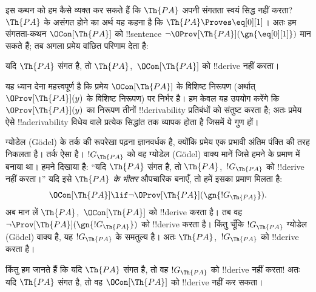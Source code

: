 \documentclass[../../../include/open-logic-section]{subfiles}
\begin{document}


इस कथन को हम कैसे व्यक्त कर सकते हैं कि $\Th{PA}$ अपनी संगतता स्वयं सिद्ध
नहीं करता? $\Th{PA}$ के असंगत होने का अर्थ यह कहना है कि
$\Th{PA} \Proves \eq[0][1]$। अतः हम संगतता-कथन $\OCon[\Th{PA}]$ को
!!{sentence} $\lnot \OProv[\Th{PA}](\gn{\eq[0][1]})$ मान सकते हैं; तब
अगला प्रमेय वांछित परिणाम देता है:

\begin{thm}
यदि $\Th{PA}$ संगत है, तो $\Th{PA}$,~$\OCon[\Th{PA}]$ को !!{derive} नहीं
करता।
\end{thm}

यह ध्यान देना महत्त्वपूर्ण है कि प्रमेय $\OCon[\Th{PA}]$ के विशिष्ट
निरूपण (अर्थात् $\OProv[\Th{PA}](y)$ के विशिष्ट निरूपण) पर निर्भर है। हम
केवल यह उपयोग करेंगे कि $\OProv[\Th{PA}](y)$ का निरूपण तीनों
!!{derivability} प्रतिबंधों को संतुष्ट करता है; अतः प्रमेय ऐसे
!!a{derivability} विधेय वाले प्रत्येक सिद्धांत तक व्यापक होता है जिसमें ये
गुण हों।

ग्योडेल (G\"odel) के तर्क की रूपरेखा पढ़ना ज्ञानवर्धक है, क्योंकि प्रमेय
एक प्रभावी अंतिम पंक्ति की तरह निकलता है। तर्क ऐसा है। $!G_\Th{PA}$ को वह
ग्योडेल (G\"odel) वाक्य मानें जिसे हमने  के
प्रमाण में बनाया था। हमने दिखाया है: ``यदि $\Th{PA}$ संगत है, तो
$\Th{PA}$,~$!G_\Th{PA}$ को !!{derive} नहीं करता।'' यदि इसे $\Th{PA}$
\emph{के भीतर} औपचारिक बनाएँ, तो हमें इसका प्रमाण मिलता है:
\[
\OCon[\Th{PA}] \lif \lnot \OProv[\Th{PA}](\gn{!G_\Th{PA}}).
\]
अब मान लें $\Th{PA}$,~$\OCon[\Th{PA}]$ को !!{derive} करता है। तब वह
$\lnot \Prov[\Th{PA}](\gn{!G_\Th{PA}})$ को !!{derive} करता है। किंतु
चूँकि $!G_\Th{PA}$ ग्योडेल (G\"odel) वाक्य है, यह $!G_\Th{PA}$ के समतुल्य है। अतः
$\Th{PA}$,~$!G_\Th{PA}$ को !!{derive} करता है।

किंतु हम जानते हैं कि यदि $\Th{PA}$ संगत है, तो वह $!G_\Th{PA}$ को
!!{derive} नहीं करता!{} अतः यदि $\Th{PA}$ संगत है, तो वह
$\OCon[\Th{PA}]$ को !!{derive} नहीं कर सकता।
\end{document}
